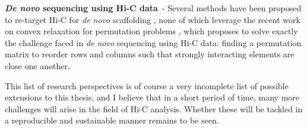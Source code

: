 \textbf{\textit{De novo} sequencing using Hi-C data}\ - Several methods have
been proposed to re-target Hi-C for \textit{de novo} scaffolding
\citep{burton:chromosome, kaplan:high-throughput, marie-nelly:high-quality},
none of which leverage the recent work on convex relaxation for permutation
problems \citet{fogel:convex}, which proposes to solve exactly the challenge
faced in \textit{de novo} sequencing using Hi-C data: finding a permutation
matrix to reorder rows and columns such that strongly interacting elements are
close one another.

This list of research perspectives is of course a very incomplete list of
possible extensions to this thesis, and I believe that in a short period of
time, many more challenges will arise in the field of Hi-C analysis. Whether
these will be tackled in a reproducible and sustainable manner remains to be
seen.

